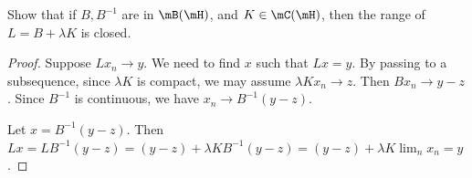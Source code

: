 \documentclass{article}
\begin{document}
 Show that if $B, B^{-1}$ are in $\mB(\mH)$, and $K \in \mC(\mH)$, then the range of $L = B + \lambda K$ is closed.

\begin{proof}
Suppose $Lx_n \to y$. We need to find $x$ such that $Lx = y$. By passing to a subsequence, since $\lambda K$ is compact, we may assume $\lambda K x_n \to z$.  Then $B x_n \to y - z$.   Since $B^{-1}$ is continuous, we have $x_n \to B^{-1}(y-z)$. 

Let $x = B^{-1}(y-z)$. Then $Lx = L B^{-1}(y-z) = (y - z) + \lambda K B^{-1}(y-z) =  (y - z) + \lambda K \lim_n x_n = y$.
\end{proof}
\end{document}
